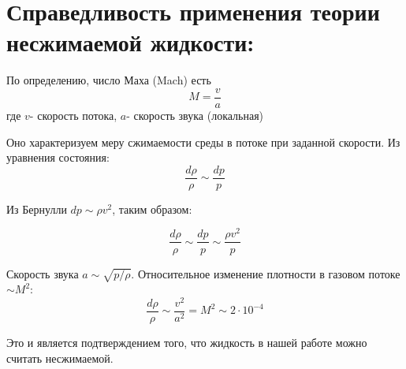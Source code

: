 \documentclass[a4paper]{article}
\begin{document}
\section*{Справедливость применения теории несжимаемой жидкости:}

По определению, число Маха (Mach) есть 
$$ M = \frac{v}{a}$$
где $v$- скорость потока, $a$- скорость звука (локальная)

Оно характеризуем меру сжимаемости среды в потоке при заданной скорости.
Из уравнения состояния:
$$\frac{d \rho}{\rho} \sim \frac{dp}{p}$$

Из Бернулли $dp\sim \rho v^2$, таким образом:

$$\frac{d \rho}{\rho} \sim \frac{dp}{p} \sim \frac{\rho v^2}{p}$$

Скорость звука $a \sim \sqrt{p / \rho}$. Относительное изменение плотности в газовом потоке $\sim M^2$:
$$\frac{d \rho}{\rho} \sim \frac{v^2}{a^2} = M^2 \sim 2 \cdot 10^{-4}$$

Это и является подтверждением того, что жидкость в нашей работе можно считать несжимаемой.
\end{document}
